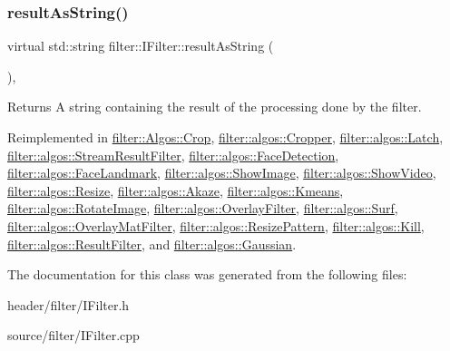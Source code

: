 \subsubsection{\texorpdfstring{result\+As\+String()}{resultAsString()}}
{\footnotesize\ttfamily virtual std\+::string filter\+::\+I\+Filter\+::result\+As\+String (\begin{DoxyParamCaption}{ }\end{DoxyParamCaption})\hspace{0.3cm}{\ttfamily [inline]}, {\ttfamily [virtual]}}

\begin{DoxyReturn}{Returns}
A string containing the result of the processing done by the filter. 
\end{DoxyReturn}


Reimplemented in \hyperlink{classfilter_1_1_algos_1_1_crop_a44ded08379421eb046be865a884139e8}{filter\+::\+Algos\+::\+Crop}, \hyperlink{classfilter_1_1algos_1_1_cropper_ae970d5d448587b8288aca2484f12f2fa}{filter\+::algos\+::\+Cropper}, \hyperlink{classfilter_1_1algos_1_1_latch_a24c57b8d90c89b1f95fe2f7624a9d033}{filter\+::algos\+::\+Latch}, \hyperlink{classfilter_1_1algos_1_1_stream_result_filter_acdd774d7dc6a7b807d5fc0bfe3343949}{filter\+::algos\+::\+Stream\+Result\+Filter}, \hyperlink{classfilter_1_1algos_1_1_face_detection_a11c5004107d5048de93ae81ced065a26}{filter\+::algos\+::\+Face\+Detection}, \hyperlink{classfilter_1_1algos_1_1_face_landmark_a58eca9d87717bac1696c2b008af4342a}{filter\+::algos\+::\+Face\+Landmark}, \hyperlink{classfilter_1_1algos_1_1_show_image_a752acc552a91b93b42acf0a1269b5e73}{filter\+::algos\+::\+Show\+Image}, \hyperlink{classfilter_1_1algos_1_1_show_video_a8fc9113fbd7f9648ea0997304ca91aec}{filter\+::algos\+::\+Show\+Video}, \hyperlink{classfilter_1_1algos_1_1_resize_a5f4bc6f31fd5d759f1216ce60b1358b0}{filter\+::algos\+::\+Resize}, \hyperlink{classfilter_1_1algos_1_1_akaze_afbbbf680eb0c14ea7e47dbc78169f32b}{filter\+::algos\+::\+Akaze}, \hyperlink{classfilter_1_1algos_1_1_kmeans_aed99c18aeec39add2955b2b9b3361a8a}{filter\+::algos\+::\+Kmeans}, \hyperlink{classfilter_1_1algos_1_1_rotate_image_af9aeff9c2232e6fc97708cbc41ee1fb2}{filter\+::algos\+::\+Rotate\+Image}, \hyperlink{classfilter_1_1algos_1_1_overlay_filter_ac591ab39d8e08ccfe8f96020e438958d}{filter\+::algos\+::\+Overlay\+Filter}, \hyperlink{classfilter_1_1algos_1_1_surf_ad7aae2eb2e5a5f2a0277eb5d58153833}{filter\+::algos\+::\+Surf}, \hyperlink{classfilter_1_1algos_1_1_overlay_mat_filter_a819c132897fd3a1e4f4f28378313ccdd}{filter\+::algos\+::\+Overlay\+Mat\+Filter}, \hyperlink{classfilter_1_1algos_1_1_resize_pattern_ae36ff1d98ef8f2dd32ba5b7a3a50152f}{filter\+::algos\+::\+Resize\+Pattern}, \hyperlink{classfilter_1_1algos_1_1_kill_af12b57f54905370350c6a7f291f99a6c}{filter\+::algos\+::\+Kill}, \hyperlink{classfilter_1_1algos_1_1_result_filter_a0a67e26005d8b32a69fb6e6bec80788c}{filter\+::algos\+::\+Result\+Filter}, and \hyperlink{classfilter_1_1algos_1_1_gaussian_a5f2ba86fa61807781b46fe321e435c29}{filter\+::algos\+::\+Gaussian}.



The documentation for this class was generated from the following files\+:\begin{DoxyCompactItemize}
\item 
header/filter/I\+Filter.\+h\item 
source/filter/I\+Filter.\+cpp\end{DoxyCompactItemize}

